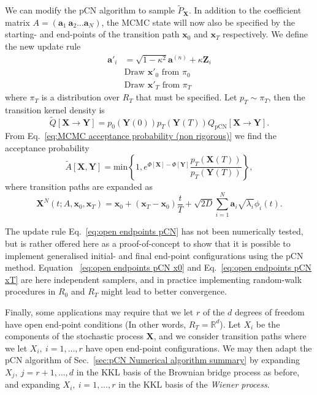 We can modify the pCN algorithm to sample $\tilde{P}_\mathbf{X}$. In addition to the coefficient matrix $A = ( \mathbf{a}_1\ \mathbf{a}_2 \dots \mathbf{a}_N )$, the MCMC state will now also be specified by the starting- and end-points of the transition path $\mathbf{x}_0$ and $\mathbf{x}_T$ respectively. We define the new update rule
\begin{subequations} \label{eq:open endpoints pCN}
	\begin{align}
		\mathbf{a}'_i & = \sqrt{1 - \kappa^2} \mathbf{a}^{(n)} + \kappa \mathbf{Z}_i \\
		& \text{Draw } \mathbf{x}'_0 \text{ from } \pi_0 \label{eq:open endpoints pCN x0} \\
		& \text{Draw } \mathbf{x}'_T \text{ from } \pi_T \label{eq:open endpoints pCN xT}
	\end{align}
\end{subequations}
where $\pi_T$ is a distribution over $R_T$ that must be specified. Let $p_T \sim \pi_T$, then the transition kernel density is
\begin{equation}
	\tilde{Q}[\mathbf{X} \to \mathbf{Y}] = p_0(\mathbf{Y}(0)) p_T(\mathbf{Y}(T)) Q_\text{pCN}[\mathbf{X} \to \mathbf{Y}].
\end{equation}
From Eq.~\ref{eq:MCMC acceptance probability (non rigorous)} we find the acceptance probability
\begin{equation}
	\tilde{A}[\mathbf{X}, \mathbf{Y}] = \text{min} \left\{
		1,
		e^{\Phi[\mathbf{X}] - \Phi[\mathbf{Y}]} \frac{p_T(\mathbf{X}(T))}{p_T(\mathbf{Y}(T))}
	\right\},
\end{equation}
where transition paths are expanded as
\begin{equation} \label{eq:KKL expansion of transition paths 2}
	\mathbf{X}^N(t;A,\mathbf{x}_0, \mathbf{x}_T) = \mathbf{x}_0 + (\mathbf{x}_T - \mathbf{x}_0) \frac{t}{T} +\sqrt{2 D} \sum_{i=1}^N \mathbf{a}_i \sqrt{\lambda_i} \phi_i(t).
\end{equation}


The update rule Eq.~\ref{eq:open endpoints pCN} has not been numerically tested, but is rather offered here as a proof-of-concept to show that it is possible to implement generalised initial- and final end-point configurations using the pCN method. Equation ~\ref{eq:open endpoints pCN x0} and Eq.~\ref{eq:open endpoints pCN xT} are here independent samplers, and in practice implementing random-walk procedures in $R_0$ and $R_T$ might lead to better convergence.

Finally, some applications may require that we let $r$ of the $d$ degrees of freedom have open end-point conditions (In other words, $R_T = \mathbb{R}^d$). Let $X_i$ be the components of the stochastic process $\mathbf{X}$, and we consider transition paths where we let $X_i,\ i=1,\dots,r$ have open end-point configurations. We may then adapt the pCN algorithm of Sec.~\ref{sec:pCN Numerical algorithm summary} by expanding $X_j,\ j=r+1,\dots,d$ in the KKL basis of the Brownian bridge process as before, and expanding $X_i,\ i=1,\dots,r$ in the KKL basis of the \textit{Wiener process}.

